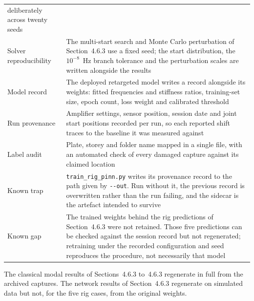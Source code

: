 \documentclass[12pt]{report}
\newcommand{\sect}[1]{4.6.3}
\begin{document}
\begin{xltabular}{\textwidth}{@{}
    >{\RaggedRight\arraybackslash{}\hsize}X
    >{\RaggedRight\arraybackslash{}\hsize}X @{}}
    deliberately across twenty seeds \\
Solver reproducibility
  & The multi-start search and Monte Carlo perturbation of Section~\sect{} use a fixed
    seed; the start distribution, the $10^{-8}$~Hz branch tolerance and the perturbation
    scales are written alongside the results \\
Model record
  & The deployed retargeted model writes a record alongside its weights: fitted frequencies
    and stiffness ratios, training-set size, epoch count, loss weight and calibrated
    threshold \\
\addlinespace
Run provenance
  & Amplifier settings, sensor position, session date and joint start positions recorded
    per run, so each reported shift traces to the baseline it was measured against \\
Label audit
  & Plate, storey and folder name mapped in a single file, with an automated check of every
    damaged capture against its claimed location \\
\addlinespace
Known trap
  & \texttt{train\_rig\_pinn.py} writes its provenance record to the path given by
    \texttt{-{}-out}. Run without it, the previous record is overwritten rather than the run
    failing, and the sidecar is the artefact intended to survive \\
Known gap
  & The trained weights behind the rig predictions of Section~\sect{} were not retained.
    Those five predictions can be checked against the session record but not regenerated;
    retraining under the recorded configuration and seed reproduces the procedure, not
    necessarily that model \\
\end{xltabular}

\vspace{0.4em}
\noindent\begin{minipage}{\textwidth}
\footnotesize\RaggedRight
The classical modal results of Sections~\sect{} to~\sect{} regenerate in full from the
archived captures. The network results of Section~\sect{} regenerate on simulated data but
not, for the five rig cases, from the original weights.
\end{minipage}
\endgroup
\end{document}
